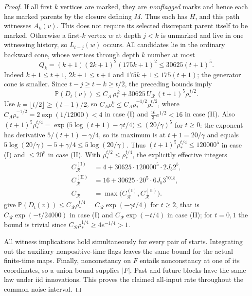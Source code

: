 \begin{proof}
If all first $k$ vertices are marked, they are \emph{nonflagged} marks and hence each has marked parents by the closure defining $M$. Thus each has $H$, and this path witnesses $A_k(v)$. This does not require its selected discrepant parent itself to be marked. Otherwise a first-$k$ vertex $w$ at depth $j<k$ is unmarked and live in one witnessing history, so $L_{t-j}(w)$ occurs. All candidates lie in the ordinary backward cone, whose vertices through depth $k$ number at most
\[
 Q_k=(k+1)(2k+1)^2(175k+1)^2\le30625(t+1)^5.
\]
Indeed $k+1\le t+1$, $2k+1\le t+1$ and $175k+1\le175(t+1)$; the generator cone is smaller. Since $t-j\ge t-k\ge t/2$, the preceding bounds imply
\[
  \mathbb{P}(D_t(v))\le C_A\,\rho_*^{\,k}+30625\,U_{\mathcal R}\,(t+1)^5\rho_*^{\,t/2}.
\]
Use $k=\lfloor t/2\rfloor\ge(t-1)/2$, so $C_A\rho_*^k\le C_A\rho_*^{-1/2}\rho_*^{t/2}$, where
$C_A\rho_*^{-1/2}=2\exp(1/12000)<4$ in case (I) and $\frac{16}{3}e^{1/2}<16$ in case (II). Also
$(t+1)^5\rho_*^{t/4}=\exp\bigl(5\log(t+1)-\gamma t/4\bigr)\le(20/\gamma)^5$ for $t\ge0$: the exponent
has derivative $5/(t+1)-\gamma/4$, so its maximum is at $t+1=20/\gamma$ and equals
$5\log(20/\gamma)-5+\gamma/4\le5\log(20/\gamma)$. Thus $(t+1)^5\rho_*^{t/4}\le120000^5$ in case (I)
and $\le20^5$ in case (II). With $\rho_*^{t/2}\le\rho_*^{t/4}$, the explicitly effective integers
\[
\begin{aligned}
 C^{(\mathrm I)}_{\mathcal R}&=4+30625\cdot120000^5\cdot2J_b2^b,\\
 C^{(\mathrm{II})}_{\mathcal R}&=16+30625\cdot20^5\cdot6J_b3^{701b},\\
 C_{\mathcal R}&=\max\bigl(C^{(\mathrm I)}_{\mathcal R},C^{(\mathrm{II})}_{\mathcal R}\bigr).
\end{aligned}
\]
give $\mathbb{P}(D_t(v))\le C_{\mathcal R}\rho_*^{t/4}=C_{\mathcal R}\exp(-\gamma t/4)$ for $t\ge2$, that is
$C_{\mathcal R}\exp(-t/24000)$ in case (I) and $C_{\mathcal R}\exp(-t/4)$ in case (II); for $t=0,1$ the bound is trivial
since $C_{\mathcal R}\rho_*^{1/4}\ge4e^{-1/4}>1$.

All witness implications hold simultaneously for every pair of starts. Integrating out the auxiliary nonpositive-time flags leaves the same bound for the actual finite-time maps. Finally, nonconstancy on $F$ entails nonconstancy at one of its coordinates, so a union bound supplies $|F|$. Past and future blocks have the same law under iid innovations. This proves the claimed all-input rate throughout the common noise interval.
\end{proof}

